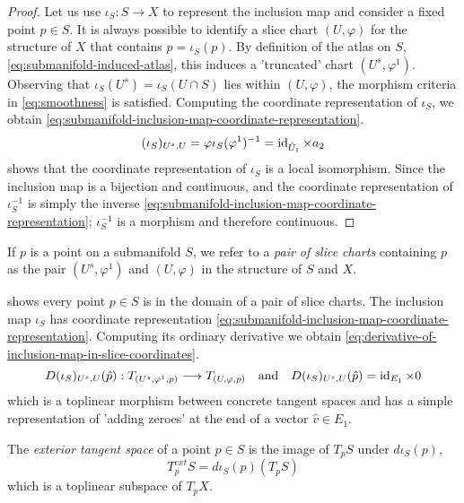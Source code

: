 \documentclass[../main-manifolds.tex]{subfiles}
\begin{document}
\begin{proof}
    Let us use $\iota_{S}: S\to X$ to represent the inclusion map and consider a fixed point $p\in S$. It is always possible to identify a slice chart $(U,\varphi)$ for the structure of $X$ that contains $p =\iota_S(p)$. By definition of the atlas on $S$, \cref{eq:submanifold-induced-atlas}, this induces a 'truncated' chart $(U^s,\varphi^1)$. \\
    
    Observing that $\iota_S(U^s) = \iota_S(U\cap S)$ lies within $(U,\varphi)$, the morphism criteria in \cref{eq:smoothness} is satisfied. Computing the coordinate representation of $\iota_S$, we obtain \cref{eq:submanifold-inclusion-map-coordinate-representation}.
    \begin{equation}\label{eq:submanifold-inclusion-map-coordinate-representation}
        (\iota_S)_{U^s,U} = \varphi\iota_S(\varphi^1)^{-1} = \operatorname{id}_{\hat{U}_1}\times a_2
    \end{equation}
     shows that the coordinate representation of $\iota_S$ is a local isomorphism. Since the inclusion map is a bijection and continuous, and the coordinate representation of $\iota_S^{-1}$ is simply the inverse \cref{eq:submanifold-inclusion-map-coordinate-representation}; $\iota_S^{-1}$ is a morphism and therefore continuous.
\end{proof}
%
%
\begin{remark}\label{rmk:pairs-of-slice-charts}
    If $p$ is a point on a submanifold $S$, we refer to a \emph{pair of slice charts} containing $p$ as the pair $(U^s,\varphi^1)$ and $(U,\varphi)$ in the structure of $S$ and $X$. 
\end{remark}
%
%
 shows every point $p\in S$ is in the domain of a pair of slice charts. The inclusion map $\iota_S$ has coordinate representation \cref{eq:submanifold-inclusion-map-coordinate-representation}. Computing its ordinary derivative we obtain \cref{eq:derivative-of-inclusion-map-in-slice-coordinates}.
\begin{equation}\label{eq:derivative-of-inclusion-map-in-slice-coordinates}
    D(\iota_S)_{U^s,U}(\hat{p}): T_{(U^s,\varphi^1,p)}\longrightarrow T_{(U,\varphi,p)}\qqtext{and} D(\iota_S)_{U^s,U}(\hat{p}) = \id{E_1}\times 0
\end{equation}
%
which is a toplinear morphism between concrete tangent spaces and has a simple representation of 'adding zeroes' at the end of a vector $\hat{v}\in E_1$. 
%
\begin{definition}
    The \emph{exterior tangent space} of a point $p\in S$ is the image of $T_p S$ under $d\iota_S(p)$,
    \begin{equation}\label{eq:exterior-tangent-space}
        T_p^{ext}S = d\iota_S(p)(T_p S)
    \end{equation}
    which is a toplinear subspace of $T_p X$. 
\end{definition}
\end{document}
